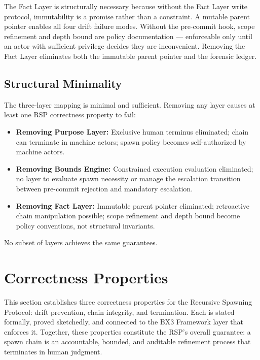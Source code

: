 The Fact Layer is structurally necessary because without the Fact Layer write protocol, immutability is a promise rather than a constraint. A mutable parent pointer enables all four drift failure modes. Without the pre-commit hook, scope refinement and depth bound are policy documentation — enforceable only until an actor with sufficient privilege decides they are inconvenient. Removing the Fact Layer eliminates both the immutable parent pointer and the forensic ledger.

\subsection{Structural Minimality}
\label{sec:rs-minimality}

The three-layer mapping is minimal and sufficient. Removing any layer causes at least one RSP correctness property to fail:

\begin{itemize}
  \item \textbf{Removing Purpose Layer:} Exclusive human terminus eliminated; chain can terminate in machine actors; spawn policy becomes self-authorized by machine actors.
  \item \textbf{Removing Bounds Engine:} Constrained execution evaluation eliminated; no layer to evaluate spawn necessity or manage the escalation transition between pre-commit rejection and mandatory escalation.
  \item \textbf{Removing Fact Layer:} Immutable parent pointer eliminated; retroactive chain manipulation possible; scope refinement and depth bound become policy conventions, not structural invariants.
\end{itemize}

No subset of layers achieves the same guarantees.

\section{Correctness Properties}
\label{sec:rs-correctness}

This section establishes three correctness properties for the Recursive Spawning Protocol: drift prevention, chain integrity, and termination. Each is stated formally, proved sketchedly, and connected to the BX3 Framework layer that enforces it. Together, these properties constitute the RSP's overall guarantee: a spawn chain is an accountable, bounded, and auditable refinement process that terminates in human judgment.

